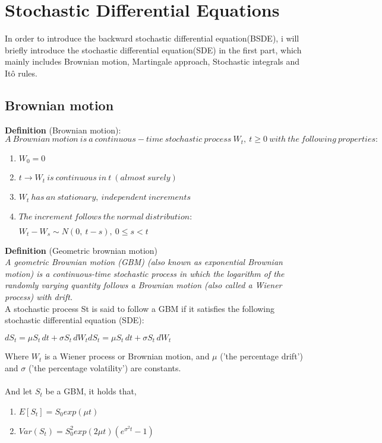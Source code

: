 \documentclass{article}
\begin{document}
\newpage
\section{Stochastic Differential Equations} %

In order to introduce the backward stochastic differential equation(BSDE), i will briefly introduce the stochastic differential equation(SDE) in the first part, which mainly includes Brownian motion, Martingale approach, Stochastic integrals and It\^{o} rules.
\subsection{Brownian motion}

\textbf{Definition} (Brownian motion): \\
$A\  Brownian\  motion\  is\  a\  continuous-time\  stochastic\  process\  W_{t},\  t\geqslant 0\  with\  the\  following\  properties: $ 

	\begin{enumerate}[(1).]
		\item $W{}_{0}=0$
		\item $t\longrightarrow W_{t}\  is\  continuous\  in\  t\  \left( almost\  surely\right)  $
		\item $W_{t}\  has\  an\  stationary,\  independent\  increments$
		\item $The\  increment\  follows\  the\  normal\  distribution:$\begin{center}
			$W_{t}-W_{s}\sim N\left( 0,\  t-s\right)  ,\  0\leqslant s<t$
		\end{center}
		
	\end{enumerate}
\textbf{Definition} (Geometric brownian motion)\\
\textit{A geometric Brownian motion (GBM) (also known as exponential Brownian motion) is a continuous-time stochastic process in which the logarithm of the randomly varying quantity follows a Brownian motion (also called a Wiener process) with drift.}\\
A stochastic process St is said to follow a GBM if it satisfies the following stochastic differential equation (SDE):
\begin{center}
${\displaystyle dS_{t}=\mu S_{t}\,dt+\sigma S_{t}\,dW_{t}}dS_{t}=\mu S_{t}\,dt+\sigma S_{t}\,dW_{t}$
\end{center}
Where $W_{t}$ is a Wiener process or Brownian motion, and $\mu$ ('the percentage drift') and $\sigma$  ('the percentage volatility') are constants.\\
~\\
And let $S_{t}$ be a GBM, it holds that,
\begin{enumerate}[(1).]
	\item $E\left[ S_{t}\right]  =S_{0}exp\left( \mu t\right)  $
	\item $Var\left( S_{t}\right)  =S^{2}_{0}exp\left( 2\mu t\right)  \left( e^{\sigma^{2} t}-1\right)  $
\end{enumerate}
\end{document}
